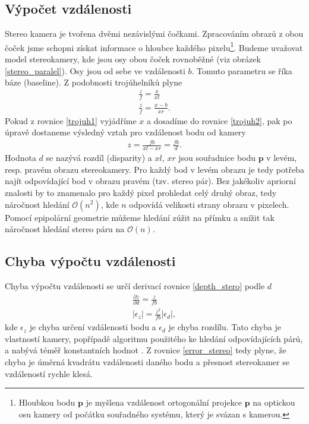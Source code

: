 \documentclass[twoside]{ctuthesis}
\newcommand{\tl}[1]{$\mathbf{#1}$}
\begin{document}
\subsection{Výpočet vzdálenosti}
Stereo kamera je tvořena dvěmi nezávislými čočkami. Zpracováním obrazů z obou čoček jsme schopni získat informace o hloubce každého pixelu\footnote{Hloubkou bodu \tl{p} je myšlena vzdálenost ortogonální projekce \tl{p} na optickou osu kamery od počátku souřadného systému, který je svázan s kamerou.}. Budeme uvažovat model stereokamery, kde jsou osy obou čoček rovnoběžné (viz obrázek \ref{stereo_paralel}). Osy jsou od sebe ve vzdálenosti $b$. Tomuto parametru se říka báze (baseline). Z podobnosti trojúhelníků plyne
\begin{align}
    \frac{z}{f} = \frac{x}{xl} \label{trojuh1} \\
    \frac{z}{f} = \frac{x - b}{xr} \label{trojuh2}.
\end{align}
Pokud z rovnice \ref{trojuh1} vyjádříme $x$ a dosadíme do rovnice \ref{trojuh2}, pak po úpravě dostaneme výsledný vztah pro vzdálenost bodu od kamery 
\begin{align}
    z = \frac{fb}{xl - xr} = \frac{fb}{d}.
    \label{depth_stero}
\end{align}
Hodnota $d$ se nazývá rozdíl (disparity) a $xl$, $xr$ jsou souřadnice bodu \tl{p} v levém, resp. pravém obrazu stereokamery. Pro každý bod v levém obrazu je tedy potřeba najít odpovídající bod v obrazu pravém (tzv. stereo pár). Bez jakékoliv apriorní znalosti by to znamenalo pro každý pixel prohledat celý druhý obraz, tedy náročnost hledání $\mathcal{O}(n^2)$, kde $n$ odpovídá velikosti strany obrazu v pixelech. Pomocí epipolární geometrie můžeme hledání zúžit na přímku  a snížit tak náročnost hledání stereo páru na $\mathcal{O}(n)$. \cite{brown2003advances_in_stereo}

\subsection{Chyba výpočtu vzdálenosti}
Chyba výpočtu vzdálenosti se určí derivací rovnice \ref{depth_stero} podle $d$ \cite{keselman2017intel} 
\begin{align}
    \frac{\partial z}{\partial d} = \frac{z}{fb} \\
    |\epsilon_z | = \frac{z^2}{fb}|\epsilon_d |,
    \label{error_stereo}
\end{align}
kde $\epsilon_z $ je chyba určení vzdálenosti bodu a $ \epsilon_d $ je chyba rozdílu. Tato chyba je vlastností kamery, popřípadě algoritmu použitého ke hledání odpovídajících párů, a nabývá téměř konstantních hodnot \cite{keselman2017intel}. Z rovnice \ref{error_stereo} tedy plyne, že chyba je úměrná kvadrátu vzdálenosti daného bodu a přesnost stereokamer se vzdáleností rychle klesá.
\end{document}
